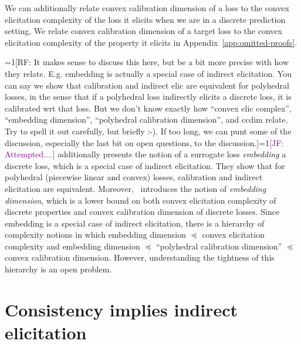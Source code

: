 \documentclass{article}
\newcommand{\Comments}{1}
\newcommand{\mynote}[2]{\ifnum\Comments=1\textcolor{#1}{#2}\fi}
\newcommand{\raf}[1]{\mynote{green!80!blue}{[RF: #1]}}
\newcommand{\jessie}[1]{\mynote{purple}{[JF: #1]}}
\begin{document}
We can additionally relate convex calibration dimension of a loss to the convex elicitation complexity of the loss it elicits when we are in a discrete prediction setting.
We relate convex calibration dimension of a target loss to the convex elicitation complexity of the property it elicits in Appendix~\ref{app:omitted-proofs}.

\raf{It makes sense to discuss this here, but be a bit more precise with how they relate.  E.g. embedding is actually a special case of indirect elicitation.  You can say we show that calibration and indirect elic are equivalent for polyhedral losses, in the sense that if a polyhedral loss indirectly elicits a discrete loss, it is calibrated wrt that loss.  But we don't know exactly how ``convex elic complex'', ``embedding dimension'', ``polyhedral calibration dimension'', and ccdim relate.  Try to spell it out carefully, but briefly :-).  If too long, we can punt some of the discussion, especially the last bit on open questions, to the discussion.}\jessie{Attempted....}
\cite{finocchiaro2019embedding} additionally presents the notion of a surrogate loss \emph{embedding} a discrete loss, which is a special case of indirect elicitation.
They show that for polyhedral (piecewise linear and convex) losses, calibration and indirect elicitation are equivalent.
Moreover,~\cite{finocchiaro2020embedding} introduces the notion of \emph{embedding dimension}, which is a lower bound on both convex elicitation complexity of discrete properties and convex calibration dimension of discrete losses.
Since embedding is a special case of indirect elicitation, there is a hierarchy of complexity notions in which embedding dimension $\preceq$ convex elicitation complexity and embedding dimension $\preceq$  ``polyhedral calibration dimension'' $\preceq$ convex calibration dimension.
However, understanding the tightness of this hierarchy is an open problem.


\section{Consistency implies indirect elicitation}\label{sec:consis-implies-indir}
\end{document}
